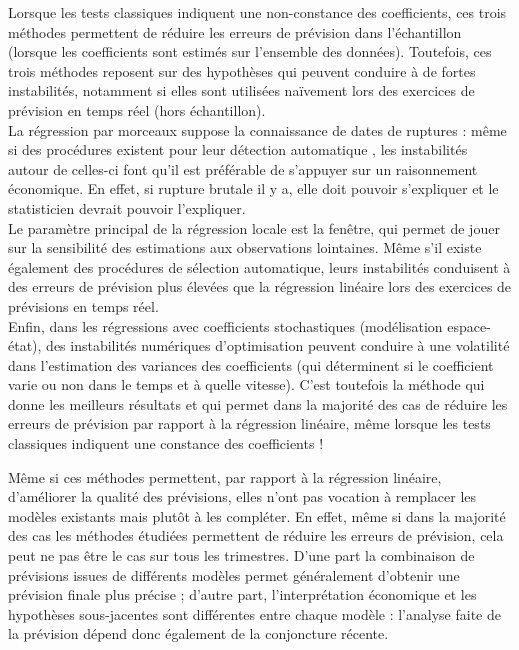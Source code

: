 \documentclass[
  a4paper,
  DIV=11,
  numbers=noendperiod,
  french]{scrartcl}
\newcommand\1{{\mathds 1}}
\theoremstyle{remark}
\begin{document}
Lorsque les tests classiques indiquent une non-constance des
coefficients, ces trois méthodes permettent de réduire les erreurs de
prévision dans l'échantillon (lorsque les coefficients sont estimés sur
l'ensemble des données). Toutefois, ces trois méthodes reposent sur des
hypothèses qui peuvent conduire à de fortes instabilités, notamment si
elles sont utilisées naïvement lors des exercices de prévision en temps
réel (hors échantillon).\\
La régression par morceaux suppose la connaissance de dates de ruptures
: même si des procédures existent pour leur détection automatique
\autocite{bai2003computation}, les instabilités autour de celles-ci font
qu'il est préférable de s'appuyer sur un raisonnement économique. En
effet, si rupture brutale il y a, elle doit pouvoir s'expliquer et le
statisticien devrait pouvoir l'expliquer.\\
Le paramètre principal de la régression locale est la fenêtre, qui
permet de jouer sur la sensibilité des estimations aux observations
lointaines. Même s'il existe également des procédures de sélection
automatique, leurs instabilités conduisent à des erreurs de prévision
plus élevées que la régression linéaire lors des exercices de prévisions
en temps réel.\\
Enfin, dans les régressions avec coefficients stochastiques
(modélisation espace-état), des instabilités numériques d'optimisation
peuvent conduire à une volatilité dans l'estimation des variances des
coefficients (qui déterminent si le coefficient varie ou non dans le
temps et à quelle vitesse). C'est toutefois la méthode qui donne les
meilleurs résultats et qui permet dans la majorité des cas de réduire
les erreurs de prévision par rapport à la régression linéaire, même
lorsque les tests classiques indiquent une constance des coefficients !

Même si ces méthodes permettent, par rapport à la régression linéaire,
d'améliorer la qualité des prévisions, elles n'ont pas vocation à
remplacer les modèles existants mais plutôt à les compléter. En effet,
même si dans la majorité des cas les méthodes étudiées permettent de
réduire les erreurs de prévision, cela peut ne pas être le cas sur tous
les trimestres. D'une part la combinaison de prévisions issues de
différents modèles permet généralement d'obtenir une prévision finale
plus précise \autocite[voir par exemple][ pour une revue de
littérature]{WANG20231518} ; d'autre part, l'interprétation économique
et les hypothèses sous-jacentes sont différentes entre chaque modèle :
l'analyse faite de la prévision dépend donc également de la conjoncture
récente.
\end{document}
